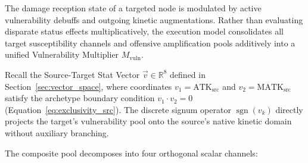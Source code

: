 \documentclass[twocolumn,10pt]{article}
\DeclareMathOperator{\sgn}{sgn}
\begin{document}
The damage reception state of a targeted node is modulated by active vulnerability debuffs and outgoing kinetic augmentations. Rather than evaluating disparate status effects multiplicatively, the execution model consolidates all target susceptibility channels and offensive amplification pools additively into a unified Vulnerability Multiplier $M_{\text{vuln}}$.

Recall the Source-Target Stat Vector $\vec{v} \in \mathbb{R}^8$ defined in Section~\ref{sec:vector_space}, where coordinates $v_1 = \text{ATK}_{\text{src}}$ and $v_2 = \text{MATK}_{\text{src}}$ satisfy the archetype boundary condition $v_1 \cdot v_2 = 0$ (Equation~\ref{eq:exclusivity_src}). The discrete signum operator $\sgn(v_k)$ directly projects the target's vulnerability pool onto the source's native kinetic domain without auxiliary branching.

The composite pool decomposes into four orthogonal scalar channels:
\end{document}
